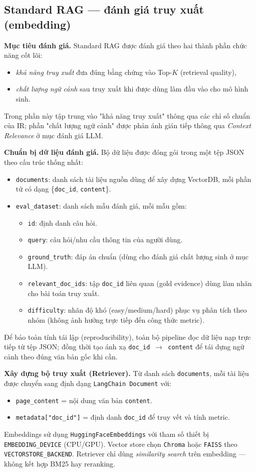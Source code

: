 \subsection{Standard RAG --- đánh giá truy xuất (embedding)}

\textbf{Mục tiêu đánh giá.} Standard RAG được đánh giá theo hai thành phần chức năng cốt lõi: 
\begin{itemize}
    \item \textit{khả năng truy xuất} đưa đúng bằng chứng vào Top-$K$ (retrieval quality), 
    \item \textit{chất lượng ngữ cảnh} sau truy xuất khi được dùng làm đầu vào cho mô hình sinh. 
\end{itemize}
Trong phần này tập trung vào "khả năng truy xuất" thông qua các chỉ số chuẩn của IR; phần "chất lượng ngữ cảnh" được phản ánh gián tiếp thông qua \textit{Context Relevance} ở mục đánh giá LLM.

\textbf{Chuẩn bị dữ liệu đánh giá.} Bộ dữ liệu được đóng gói trong một tệp JSON theo cấu trúc thống nhất:
\begin{itemize}
    \item \texttt{documents}: danh sách tài liệu nguồn dùng để xây dựng VectorDB, mỗi phần tử có dạng \{\texttt{doc\_id}, \texttt{content}\}.
    \item \texttt{eval\_dataset}: danh sách mẫu đánh giá, mỗi mẫu gồm:
    \begin{itemize}
        \item \texttt{id}: định danh câu hỏi.
        \item \texttt{query}: câu hỏi/nhu cầu thông tin của người dùng.
        \item \texttt{ground\_truth}: đáp án chuẩn (dùng cho đánh giá chất lượng sinh ở mục LLM).
        \item \texttt{relevant\_doc\_ids}: tập \texttt{doc\_id} liên quan (gold evidence) dùng làm nhãn cho bài toán truy xuất.
        \item \texttt{difficulty}: nhãn độ khó (easy/medium/hard) phục vụ phân tích theo nhóm (không ảnh hưởng trực tiếp đến công thức metric).
    \end{itemize}
\end{itemize}
Để bảo toàn tính tái lập (reproducibility), toàn bộ pipeline đọc dữ liệu nạp trực tiếp từ tệp JSON; đồng thời tạo ánh xạ \texttt{doc\_id $\rightarrow$ content} để tái dựng ngữ cảnh theo đúng văn bản gốc khi cần.

\textbf{Xây dựng bộ truy xuất (Retriever).} Từ danh sách \texttt{documents}, mỗi tài liệu được chuyển sang định dạng \texttt{LangChain Document} với:
\begin{itemize}
    \item \texttt{page\_content} = nội dung văn bản \texttt{content}.
    \item \texttt{metadata["doc\_id"]} = định danh \texttt{doc\_id} để truy vết và tính metric.
\end{itemize}
Embeddings sử dụng \texttt{HuggingFaceEmbeddings} với tham số thiết bị \texttt{EMBEDDING\_DEVICE} (CPU/GPU). Vector store chọn \texttt{Chroma} hoặc \texttt{FAISS} theo \texttt{VECTORSTORE\_BACKEND}. Retriever chỉ dùng \textit{similarity search} trên embedding --- không kết hợp BM25 hay reranking. 


